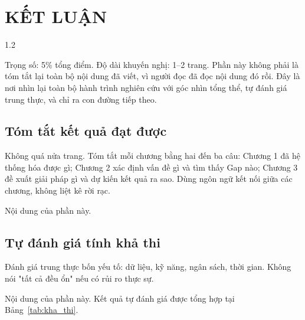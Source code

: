 
{}
\chapter*{KẾT LUẬN}

\begin{spacing}{1.2}

\setcounter{section}{0}
\renewcommand{\thesection}{\arabic{section}}
\renewcommand{\theHsection}{KL.\arabic{section}}
\setcounter{table}{0}
\renewcommand{\thetable}{KL\arabic{table}}
\renewcommand{\theHtable}{KL.\arabic{table}}

\begin{huongdan}
Trọng số: 5\% tổng điểm. Độ dài khuyến nghị: 1--2 trang. Phần này không phải là tóm tắt lại toàn bộ nội dung đã viết, vì người đọc đã đọc nội dung đó rồi. Đây là nơi nhìn lại toàn bộ hành trình nghiên cứu với góc nhìn tổng thể, tự đánh giá trung thực, và chỉ ra con đường tiếp theo.
\end{huongdan}

\section{Tóm tắt kết quả đạt được}
\label{sec:kl_tom_tat}

\begin{huongdan}
Không quá nửa trang. Tóm tắt mỗi chương bằng hai đến ba câu: Chương 1 đã hệ thống hóa được gì; Chương 2 xác định vấn đề gì và tìm thấy Gap nào; Chương 3 đề xuất giải pháp gì và dự kiến kết quả ra sao. Dùng ngôn ngữ kết nối giữa các chương, không liệt kê rời rạc.
\end{huongdan}

Nội dung của phần này.

\section{Tự đánh giá tính khả thi}
\label{sec:kl_kha_thi}

\begin{huongdan}
Đánh giá trung thực bốn yếu tố: dữ liệu, kỹ năng, ngân sách, thời gian. Không nói "tất cả đều ổn" nếu có rủi ro thực sự.
\end{huongdan}

Nội dung của phần này. Kết quả tự đánh giá được tổng hợp tại Bảng~\ref{tab:kha_thi}.


\end{spacing}
